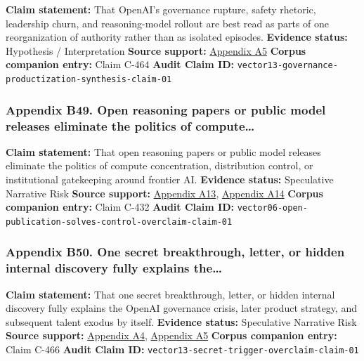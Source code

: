 \documentclass[
  american,
  11pt,
  letterpaper,
]{article}
\begin{document}
\textbf{Claim statement:} That OpenAI's governance rupture, safety
rhetoric, leadership churn, and reasoning-model rollout are best read as
parts of one reorganization of authority rather than as isolated
episodes. \textbf{Evidence status:} Hypothesis / Interpretation
\textbf{Source support:}
\hyperref[appendix-a5-exclusive-openai-working-on-new-reasoning-technology-under-code-name-strawberry]{Appendix
A5} \textbf{Corpus companion entry:} Claim C-464 \textbf{Audit Claim
ID:} \texttt{vector13-governance-productization-synthesis-claim-01}

\subsubsection{Appendix B49. Open reasoning papers or public model
releases eliminate the politics of
compute\ldots{}}\label{appendix-b49-open-reasoning-papers-or-public-model-releases-eliminate-the-politics-of-compute}

\textbf{Claim statement:} That open reasoning papers or public model
releases eliminate the politics of compute concentration, distribution
control, or institutional gatekeeping around frontier AI.
\textbf{Evidence status:} Speculative Narrative Risk \textbf{Source
support:} \hyperref[appendix-a13-deepseek-v3-technical-report]{Appendix
A13},
\hyperref[appendix-a14-deepseek-r1-incentivizing-reasoning-capability-in-llms-via-reinforcement-learning]{Appendix
A14} \textbf{Corpus companion entry:} Claim C-432 \textbf{Audit Claim
ID:}
\texttt{vector06-open-publication-solves-control-overclaim-claim-01}

\subsubsection{Appendix B50. One secret breakthrough, letter, or hidden
internal discovery fully explains
the\ldots{}}\label{appendix-b50-one-secret-breakthrough-letter-or-hidden-internal-discovery-fully-explains-the}

\textbf{Claim statement:} That one secret breakthrough, letter, or
hidden internal discovery fully explains the OpenAI governance crisis,
later product strategy, and subsequent talent exodus by itself.
\textbf{Evidence status:} Speculative Narrative Risk \textbf{Source
support:}
\hyperref[appendix-a4-openai-researchers-warned-board-of-ai-breakthrough-ahead-of-ceo-ouster-sources-say]{Appendix
A4},
\hyperref[appendix-a5-exclusive-openai-working-on-new-reasoning-technology-under-code-name-strawberry]{Appendix
A5} \textbf{Corpus companion entry:} Claim C-466 \textbf{Audit Claim
ID:} \texttt{vector13-secret-trigger-overclaim-claim-01}
\end{document}
